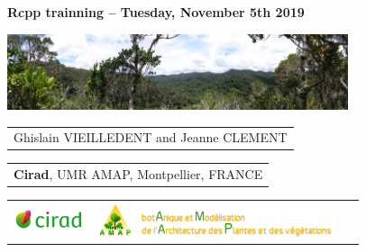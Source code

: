 {
  \begin{frame}
    \begin{center}
      \small{\textbf{Rcpp trainning -- Tuesday, November 5th 2019}}
    \end{center}
    \vspace{-0.5cm}
    \titlepage %
    \vspace{-2.5cm}
    \begin{center}
      \includegraphics[width=10cm]{figs/Banniere.png}
    \end{center}
    \begin{center}

        \begin{tabular}{c}
          Ghislain VIEILLEDENT and 
          Jeanne CLEMENT
        \end{tabular}

      \vspace{0.25cm}

        \begin{tabular}{c}
          \textbf{Cirad}, UMR AMAP, Montpellier, FRANCE 
        \end{tabular}

      \vspace{0.25cm}

      \begin{tabular}{C{2cm}C{2cm}C{3cm}}
        \includegraphics[height=0.7cm]{figs/logo_Cirad.png} &
        \includegraphics[height=1cm]{figs/logo_AMAP.png} 
        \includegraphics[height=0.8cm]{figs/AMAP-titre-long.png} &
        ~
      \end{tabular}

    \end{center}

  \end{frame}
}
\setcounter{framenumber}{0}

